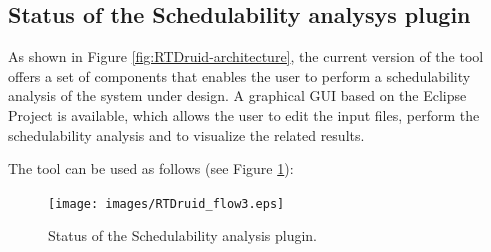 



\subsection{Status of the Schedulability analysys plugin}

As shown in Figure \ref{fig:RTDruid-architecture}, the current version
of the tool offers a set of components that enables the user to
perform a schedulability analysis of the system under design. A
graphical GUI based on the Eclipse Project is available, which allows
the user to edit the input files, perform the schedulability analysis
and to visualize the related results.

The tool can be used as follows (see Figure \ref{fig:RTDflow}):

\begin{figure}
  \begin{center}
    \texttt{[image: images/RTDruid\_flow3.eps]}
  \end{center}
  \caption{Status of the Schedulability analysis plugin.}
  \label{fig:RTDflow}
\end{figure}


